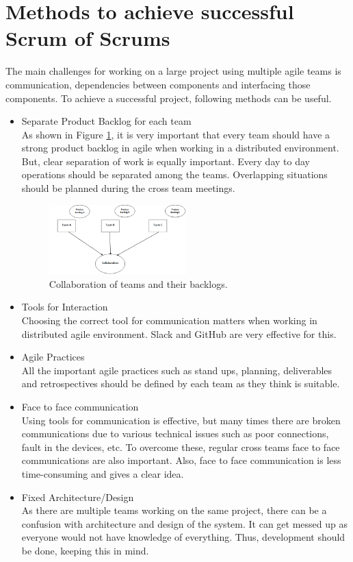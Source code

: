 \documentclass[sigconf]{acmart}
\begin{document}
\section{Methods to achieve successful Scrum of Scrums}
The main challenges for working on a large project using multiple agile teams is communication, dependencies between components and interfacing those components. To achieve a successful project, following methods can be useful\cite{SunitP}. 
\begin{itemize}
\item Separate Product Backlog for each team
\\As shown in Figure \ref{fig:PBCollab}, it is very important that every team should have a strong product backlog in agile when working in a distributed environment. But, clear separation of work is equally important. Every day to day operations should be separated among the teams. Overlapping situations should be planned during the cross team meetings.
\begin{figure}[H]
 \includegraphics[width=0.5\textwidth]{PBCollab}
  \caption{Collaboration of teams and their backlogs.}
  \label{fig:PBCollab}
\end{figure}

\item Tools for Interaction
\\Choosing the correct tool for communication matters when working in distributed agile environment. Slack and GitHub are very effective for this.

\item Agile Practices
\\All the important agile practices such as stand ups, planning, deliverables and retrospectives should be defined by each team as they think is suitable.

\item Face to face communication 
\\Using tools for communication is effective, but many times there are broken communications due to various technical issues such as poor connections, fault in the devices, etc. To overcome these, regular cross teams face to face communications are also important. Also, face to face communication is less time-consuming and gives a clear idea.

\item Fixed Architecture/Design
\\As there are multiple teams working on the same project, there can be a confusion with architecture and design of the system. It can get messed up as everyone would not have knowledge of everything. Thus, development should be done, keeping this in mind.
\end{itemize}
\end{document}
